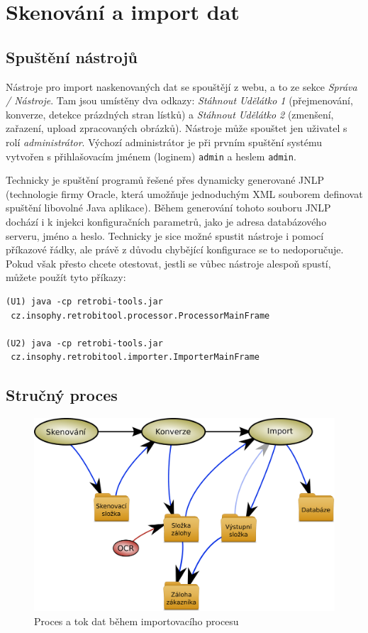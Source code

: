 \section{Skenování a import dat}

\subsection{Spuštění nástrojů}

Nástroje pro import naskenovaných dat se spouštějí z webu, a to ze sekce {\em Správa / Nástroje}. Tam jsou umístěny dva odkazy: {\em Stáhnout Udělátko 1} (přejmenování, konverze, detekce prázdných stran lístků) a {\em Stáhnout Udělátko 2} (zmenšení, zařazení, upload zpracovaných obrázků). Nástroje může spouštet jen uživatel s rolí {\em administrátor}. Výchozí administrátor je při prvním spuštění systému vytvořen s přihlašovacím jménem (loginem) {\tt admin} a heslem {\tt admin}.

Technicky je spuštění programů řešené přes dynamicky generované JNLP (technologie firmy Oracle, která umožňuje jednoduchým XML souborem definovat spuštění libovolné Java aplikace). Během generování tohoto souboru JNLP dochází i k injekci konfiguračních parametrů, jako je adresa databázového serveru, jméno a heslo. Technicky je sice možné spustit nástroje i pomocí příkazové řádky, ale právě z důvodu chybějící konfigurace se to nedoporučuje. Pokud však přesto chcete otestovat, jestli se vůbec nástroje alespoň spustí, můžete použít tyto příkazy:

\begin{verbatim}
(U1) java -cp retrobi-tools.jar 
 cz.insophy.retrobitool.processor.ProcessorMainFrame

(U2) java -cp retrobi-tools.jar 
 cz.insophy.retrobitool.importer.ImporterMainFrame
\end{verbatim}

\subsection{Stručný proces}

\begin{figure}
\label{fig:import}
\centering
\includegraphics[width=.8\textwidth]{import.pdf}
\caption{Proces a tok dat během importovacího procesu}
\end{figure}

